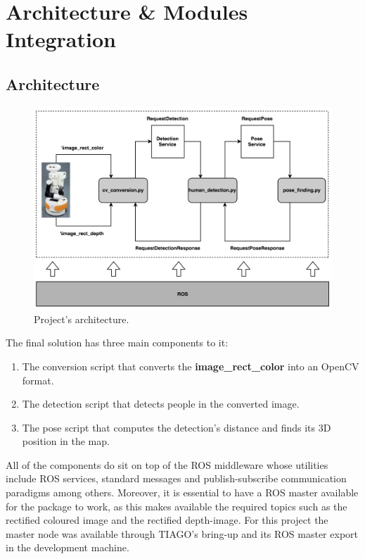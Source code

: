 \chapter{Architecture \& Modules Integration}
\label{chapter5}

\section{Architecture}

\begin{figure}[H]
  \begin{center}
    \includegraphics[width=\linewidth]{images/chapter6_architecture.png}
  \end{center}
  \caption{Project's architecture.}
  \label{fig:architecture}
\end{figure}

The final solution has three main components to it:

\begin{enumerate}
	\item The conversion script that converts the \textbf{image\_rect\_color} into an OpenCV format.
    \item The detection script that detects people in the converted image.
    \item The pose script that computes the detection's distance and finds its 3D position in the map.
\end{enumerate}

All of the components do sit on top of the ROS middleware whose utilities include ROS services, standard messages and publish-subscribe communication paradigms among others. Moreover, it is essential to have a ROS master available for the package to work, as this makes available the required topics such as the rectified coloured image and the rectified depth-image. For this project the master node was available through TIAGO's bring-up and its ROS master export in the development machine. 

